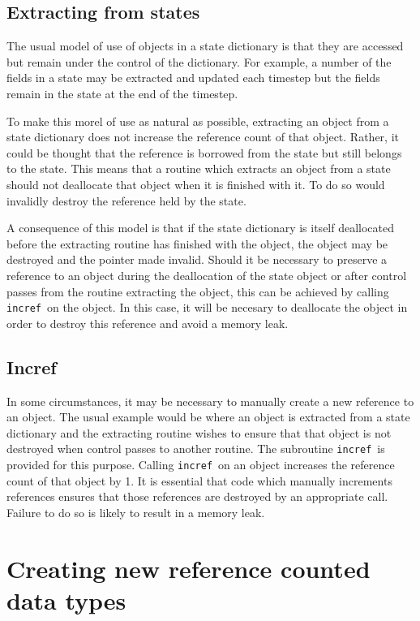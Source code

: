\documentclass[a4paper, 11pt]{book}
\begin{document}
\subsection{Extracting from  states}

The usual model of use of objects in a state dictionary is that they are
accessed but remain under the control of the dictionary. For example, a
number of the fields in a state may be extracted and updated each timestep
but the fields remain in the state at the end of the timestep. 

To make this morel of use as natural as possible, extracting an object from
a state dictionary does not increase the reference count of that
object. Rather, it could be thought that the reference is borrowed from the
state but still belongs to the state. This means that a routine which
extracts an object from a state should not deallocate that object when it is
finished with it. To do so would invalidly destroy the reference held by the
state.

A consequence of this model is that if the state dictionary is itself deallocated
before the extracting routine has finished with the object, the object may
be destroyed and the pointer made invalid. Should it be necessary to
preserve a reference to an object during the deallocation of the state
object or after control passes from the routine extracting the object, this
can be achieved by calling \lstinline+incref+\ on the object. In this case,
it will be necesary to deallocate the object in order to destroy this
reference and avoid a memory leak.

\subsection{Incref}

In some circumstances, it may be necessary to manually create a new
reference to an object. The usual example would be where an object is
extracted from a state dictionary and the extracting routine wishes to
ensure that that object is not destroyed when control passes to another
routine. The subroutine \lstinline+incref+\ is provided for this purpose. Calling
\lstinline+incref+\ on an object increases the reference count of that
object by 1. It is essential that code which manually increments references
ensures that those references are destroyed by an appropriate \deallocate
call. Failure to do so is likely to result in a memory leak.


\section{Creating new reference counted data types}
\end{document}
